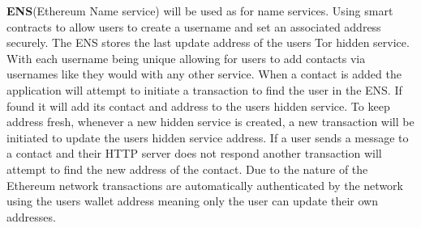 \documentclass[../main/main.tex]{subfiles}
\begin{document}
\begin{center}


\end{center}

\textbf{ENS}(Ethereum Name service) will be used as for name services. 
Using smart contracts to allow users to create a username and set an associated address securely. 
The ENS stores the last update address of the users Tor hidden service. 
With each username being unique allowing for users to add contacts via usernames like they would with any other service. 
When a contact is added the application will attempt to initiate a transaction to find the user in the ENS. 
If found it will add its contact and address to the users hidden service. 
To keep address fresh, whenever a new hidden service is created, a new transaction will be initiated to update the users hidden service address. 
If a user sends a message to a contact and their HTTP server does not respond another transaction will attempt to find the new address of the contact.
Due to the nature of the Ethereum network transactions are automatically authenticated by the network using the users wallet address \cite{ETH} meaning only the user can update their own addresses.
\end{document}
